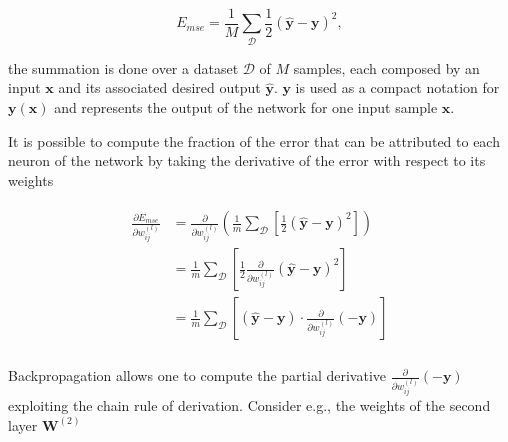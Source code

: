\begin{equation}\label{eq:MSE}
    E_{mse} = \frac{1}{M} \sum_{\mathcal{D}}\frac{1}{2}(\mathbf{\hat y} - \mathbf{y})^2,
\end{equation}

\noindent the summation is done over a dataset $\mathcal{D}$ of $M$ samples,
each composed by an input $\mathbf{x}$ and its associated desired output
$\mathbf{\hat y}$. $\mathbf{y}$ is used as a compact notation for
$\mathbf{y(x)}$ and represents the output of the network for one input sample
$\mathbf{x}$.

It is possible to compute the fraction of the error that can be attributed to
each neuron of the network by taking the derivative of the error with respect
to its weights

\begin{align}\label{eq:backprop_step1}
\begin{split}
    \frac{\partial E_{mse}}{\partial w_{ij}^{(l)}} &=
    \frac{\partial}{\partial w_{ij}^{(l)}}\left(
        \frac{1}{m}\sum_{\mathcal{D}}\left[
        \frac{1}{2}(\mathbf{\hat y} - \mathbf{y})^2\right]\right) \\
    &= \frac{1}{m}\sum_{\mathcal{D}} \left[\frac{1}{2}
        \frac{\partial}{\partial w_{ij}^{(l)}}
        \left(\mathbf{\hat y} - \mathbf{y}\right)^2\right] \\
    &= \frac{1}{m}\sum_{\mathcal{D}}\left[(\mathbf{\hat y} - \mathbf{y})
        \cdot \frac{\partial}{\partial w_{ij}^{(l)}}(-\mathbf{y})\right] \\
\end{split}
\end{align}

Backpropagation allows one to compute the partial derivative
$\frac{\partial}{\partial w_{ij}^{(l)}}(-\mathbf{y})$
exploiting the chain rule of derivation. Consider e.g., the weights of the
second layer $\mathbf{W}^{(2)}$

